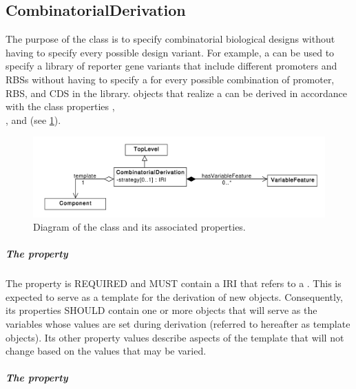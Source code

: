 \subsection{CombinatorialDerivation}
\label{sec:CombinatorialDerivation}

The purpose of the  class is to specify combinatorial biological designs without having to specify every possible design variant. For example, a  can be used to specify a library of reporter gene variants that include different promoters and RBSs without having to specify a  for every possible combination of promoter, RBS, and CDS in the library.  objects that realize a  can be derived in accordance with the class properties , \\
, and  (see \ref{uml:combinatorial_derivation}).

\begin{figure}[ht]
\begin{center}
\includegraphics[scale=0.6]{uml/combinatorial_derivation}
\caption[]{Diagram of the  class and its associated properties.}
\label{uml:combinatorial_derivation}
\end{center}
\end{figure}

\subparagraph{The  property}\label{sec:template}

The  property is REQUIRED and MUST contain a IRI that refers to a . 
This  is expected to serve as a template for the derivation of new  objects. 
Consequently, its  properties SHOULD contain one or more  objects that will serve as the variables whose values are set during derivation (referred to hereafter as template  objects).
Its other property values describe aspects of the template that will not change based on the values that may be varied.

\subparagraph{The  property}
\label{sec:hasVariableFeature}

